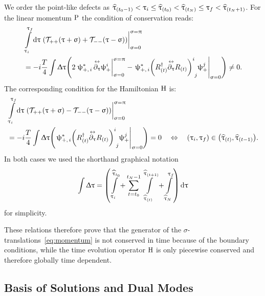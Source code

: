 We order the point-like defects as $\widehat{\uptau}_{(t_0 - 1)} < \uptau_i \le \widehat{\uptau}_{(t_0)} < \widehat{\uptau}_{(t_N)} \le \uptau_f < \widehat{\uptau}_{(t_N+1)}$.
For the linear momentum $\mathrm{P}$ the condition of conservation
reads:\footnotemark{}
\begin{equation}
  \begin{split}
    & \finiteint{\tau}{\tau_i}{\tau_f}
    \eval{\qty( \cT_{++}( \tau + \sigma ) + \cT_{--}( \tau - \sigma ) )}_{\sigma = 0}^{\sigma = \pi}
    \\
    & =
    - i \frac{T}{4}
    \int \Delta\tau
    \qty(
      2 \eval{\psi_{+,\, i}^*\, \lripd{\tau} \psi_+^i}^{\sigma = \pi}_{\sigma = 0}
      -
      \eval{\psi_{+,\, i}^* \tensor{\qty( R_{(t)}^{\dagger} \lripd{\tau} R_{(t)} )}{^i_j} \psi_+^j}_{\sigma = 0}
    )
    \neq
    0.
  \end{split}
\end{equation}
The corresponding condition for the Hamiltonian $\mathrm{H}$ is:
\begin{equation}
  \begin{split}
    & \finiteint{\tau}{\tau_i}{\tau_f}
    \eval{\qty( \cT_{++}( \tau + \sigma ) - \cT_{--}( \tau - \sigma ) )}_{\sigma = 0}^{\sigma = \pi}
    \\
    & =
    - i \frac{T}{4}
    \int \Delta\tau
    \qty( \eval{\psi_{+,\, i}^* \tensor{\qty( R_{(t)}^{\dagger} \lripd{\tau} R_{(t)} )}{^i_j} \psi_+^j}_{\sigma = 0} )
    = 0
    \quad
    \Leftrightarrow
    \quad
    \qty( \tau_i, \tau_f ) \in \qty( \htau_{(t)}, \htau_{(t-1)} ).
  \end{split}
\end{equation}
In both cases we used the shorthand graphical notation
\begin{equation}
    \int \Updelta \uptau
    =
    \qty(
      \int\limits_{\uptau_i}^{\widehat{\uptau}_{t_0}}
      +
      \sum\limits_{t = t_0}^{t_N - 1}
      \int\limits_{\widehat{\uptau}_{(t)}}^{\widehat{\uptau}_{(t+1)}}
      +
      \int\limits_{\widehat{\uptau}_N}^{\uptau_f}
    )
    \dd{\ensuremath{\uptau}}
\end{equation}
for simplicity.

These relations therefore prove that the generator of the $\sigma$-translations~\eqref{eq:momentum} is not conserved in time because of the boundary conditions, while the time evolution operator $\mathrm{H}$ is only piecewise conserved and therefore globally time dependent.


\subsection{Basis of Solutions and Dual Modes}

